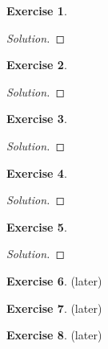 \documentclass[12pt,a4]{article}
\theoremstyle{definition}
\newtheorem{exercise}{Exercise}
\begin{document}
\begin{exercise}
	
\end{exercise}
\begin{proof}[Solution]
	
\end{proof}

\begin{exercise}
	
\end{exercise}
\begin{proof}[Solution]
	
\end{proof}

\begin{exercise}
	
\end{exercise}
\begin{proof}[Solution]
	
\end{proof}

\begin{exercise}
	
\end{exercise}
\begin{proof}[Solution]
	
\end{proof}

\begin{exercise}
	
\end{exercise}
\begin{proof}[Solution]
	
\end{proof}

\begin{exercise}
	(later)
\end{exercise}

\begin{exercise}
	(later)
\end{exercise}

\begin{exercise}
	(later)
\end{exercise}
\end{document}
